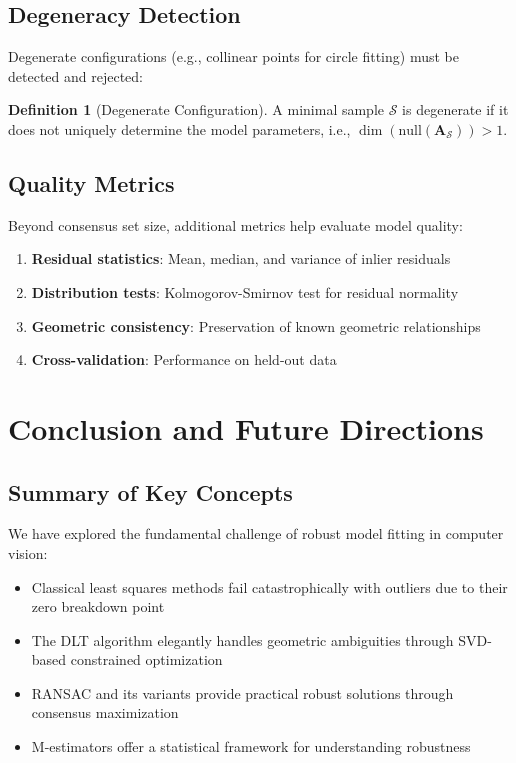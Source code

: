 \documentclass[12pt]{article}
\renewcommand{\vec}[1]{\mathbf{#1}}
\theoremstyle{definition}
\newtheorem{definition}{Definition}[section]
\begin{document}
\subsection{Degeneracy Detection}

Degenerate configurations (e.g., collinear points for circle fitting) must be detected and rejected:

\begin{definition}[Degenerate Configuration]
    A minimal sample $\mathcal{S}$ is degenerate if it does not uniquely determine the model parameters, i.e., $\dim(\text{null}(\vec{A}_\mathcal{S})) > 1$.
\end{definition}

\subsection{Quality Metrics}

Beyond consensus set size, additional metrics help evaluate model quality:

\begin{enumerate}
    \item \textbf{Residual statistics}: Mean, median, and variance of inlier residuals
    \item \textbf{Distribution tests}: Kolmogorov-Smirnov test for residual normality
    \item \textbf{Geometric consistency}: Preservation of known geometric relationships
    \item \textbf{Cross-validation}: Performance on held-out data
\end{enumerate}

\section{Conclusion and Future Directions}

\subsection{Summary of Key Concepts}

We have explored the fundamental challenge of robust model fitting in computer vision:

\begin{itemize}
    \item Classical least squares methods fail catastrophically with outliers due to their zero breakdown point
    \item The DLT algorithm elegantly handles geometric ambiguities through SVD-based constrained optimization
    \item RANSAC and its variants provide practical robust solutions through consensus maximization
    \item M-estimators offer a statistical framework for understanding robustness
\end{itemize}
\end{document}
